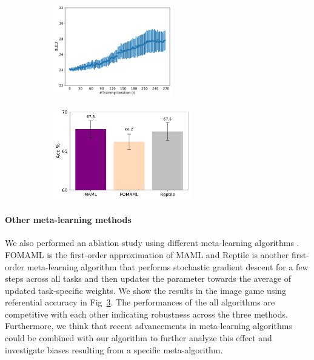 \documentclass{article}
\begin{document}
\begin{figure}
    \centering
    \begin{subfigure}{0.49\linewidth}
    \includegraphics[width=\linewidth, height=4cm]{figs/meta-listener-diversity-lang.pdf}
    \caption{}
    \label{fig:meta-speaker-diversity}
    \end{subfigure}%
    \begin{subfigure}{0.49\linewidth}
    \includegraphics[width=\linewidth, height=4cm]{figs/ablation-meta-algo.pdf}
    \caption{}
    \label{fig:ablation-meta-algo}
    \end{subfigure}
    \caption{}
\end{figure}

\paragraph{Other meta-learning methods} We also performed an ablation study using different meta-learning algorithms \citep{finn_model-agnostic_2017,nichol_first-order_2018}. FOMAML is the first-order approximation of MAML and Reptile is another first-order meta-learning algorithm that performs stochastic gradient descent for a few steps across all tasks and then updates the parameter towards the average of updated task-specific weights. We show the results in the image game using referential accuracy in Fig~\ref{fig:ablation-meta-algo}. The performances of the all algorithms are competitive with each other indicating robustness across the three methods. Furthermore, we think that recent advancements in meta-learning algorithms \citep{rothfuss2018promp,metz2018learning} could be combined with our algorithm to further analyze this effect and investigate biases resulting from a specific meta-algorithm.
\end{document}
